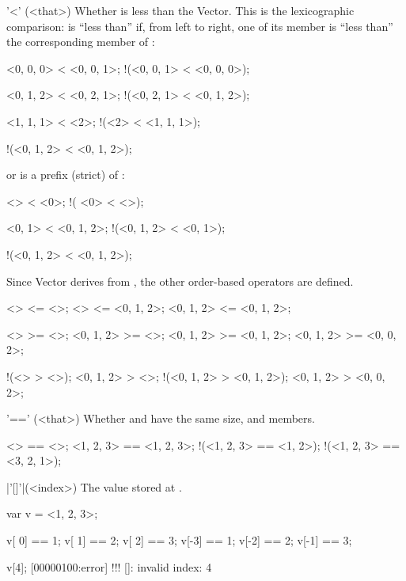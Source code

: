 \begin{urbiscriptapi}
\item['<'](<that>)%
  Whether \this is less than the \that Vector.  This is the lexicographic
  comparison: \this is ``less than'' \that if, from left to right, one of
  its member is ``less than'' the corresponding member of \that:

\begin{urbiassert}
   <0, 0, 0> < <0, 0, 1>;
 !(<0, 0, 1> < <0, 0, 0>);

   <0, 1, 2> < <0, 2, 1>;
 !(<0, 2, 1> < <0, 1, 2>);

   <1, 1, 1> < <2>;
 !(<2>       < <1, 1, 1>);

 !(<0, 1, 2> < <0, 1, 2>);
\end{urbiassert}

  \noindent
  or \that is a prefix (strict) of \this:

\begin{urbiassert}
           <> < <0>;
  !(      <0> < <>);

       <0, 1> < <0, 1, 2>;
  !(<0, 1, 2> < <0, 1>);

  !(<0, 1, 2> < <0, 1, 2>);
\end{urbiassert}

Since Vector derives from , the other order-based
operators are defined.

\begin{urbiassert}
        <> <= <>;
        <> <= <0, 1, 2>;
 <0, 1, 2> <= <0, 1, 2>;

        <> >= <>;
 <0, 1, 2> >= <>;
 <0, 1, 2> >= <0, 1, 2>;
 <0, 1, 2> >= <0, 0, 2>;

       !(<> > <>);
  <0, 1, 2> > <>;
!(<0, 1, 2> > <0, 1, 2>);
  <0, 1, 2> > <0, 0, 2>;
\end{urbiassert}


\item['=='](<that>)%
  Whether \this and \that have the same size, and members.
\begin{urbiassert}
   <> == <>;
   <1, 2, 3> == <1, 2, 3>;
 !(<1, 2, 3> == <1, 2>);
 !(<1, 2, 3> == <3, 2, 1>);
\end{urbiassert}


\item|'[]'|(<index>)%
  The value stored at .
\begin{urbiassert}
var v = <1, 2, 3>;

v[ 0] == 1; v[ 1] == 2; v[ 2] == 3;
v[-3] == 1; v[-2] == 2; v[-1] == 3;

v[4];
[00000100:error] !!! []: invalid index: 4
\end{urbiassert}



\end{urbiscriptapi}
